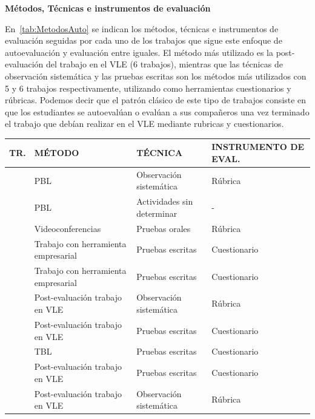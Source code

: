 \bigskip
\textbf{Métodos, Técnicas e instrumentos de evaluación}
\bigskip

En~\ref{tab:MetodosAuto} se indican los métodos, técnicas e instrumentos de evaluación seguidas por cada uno de los trabajos que sigue este enfoque de autoevaluación y evaluación entre iguales. El método más utilizado es la post-evaluación del trabajo en el VLE (6 trabajos), mientras que las técnicas de observación sistemática y las pruebas escritas son los métodos más utilizados con 5 y 6 trabajos respectivamente, utilizando como herramientas cuestionarios y rúbricas. Podemos decir que el patrón clásico de este tipo de trabajos consiste en que los estudiantes se autoevalúan o evalúan a sus compañeros una vez terminado el trabajo que debían realizar en el VLE mediante rubricas y cuestionarios. 

\begin{table}
  \begin{center}
  \begin{tabular}{| c | m{5.5cm} | m{4.5cm} | m{3cm} |}
    \hline
    TR. & MÉTODO & TÉCNICA & INSTRUMENTO DE EVAL. \\
    \hline
    \hline
    \cite{lasa2013problem} & PBL & Observación sistemática & Rúbrica \\
    \hline
    \cite{renau2010teaching} & PBL & Actividades sin determinar  & - \\
    \hline
    \cite{masip2013self} & Videoconferencias & Pruebas orales & Rúbrica \\
    \hline
    \cite{chang2009international} & Trabajo con herramienta empresarial & Pruebas escritas & Cuestionario  \\
    \hline
    \cite{achcaoucaou2014competence} & Trabajo con  herramienta empresarial & Pruebas escritas & Cuestionario  \\
    \hline
    \cite{arno2011promoting} & Post-evaluación trabajo en VLE & Observación sistemática & Rúbrica\\
    \hline
    \cite{sevilla2012assessment} &  Post-evaluación trabajo en VLE & Pruebas escritas & Cuestionario \\
    \hline
    \cite{ficapal2015learning} &  TBL & Pruebas escritas & Cuestionario \\
    \hline
    \cite{ruizacarate2013soft} &  Post-evaluación trabajo en VLE & Pruebas escritas & Cuestionario \\
    \hline
    \cite{piedra2010measuring} &  Post-evaluación trabajo en VLE & Observación sistemática & Rúbrica \\

\end{tabular}
\end{center}
\end{table}
